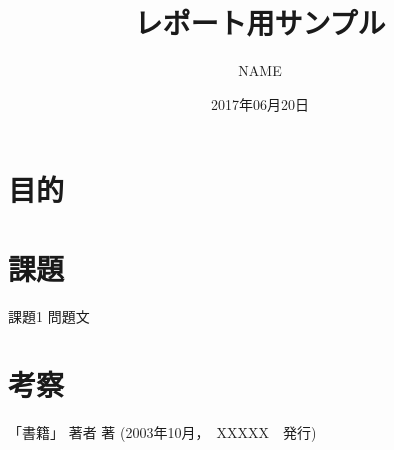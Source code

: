 \documentclass[11pt]{jsarticle}
\title{レポート用サンプル}
\date{2017年06月20日}
\author{NAME}
\begin{document}
	\maketitle
  \section{目的}

  \section{課題}
		\begin{itembox}[l]{課題1}
			問題文
		\end{itembox}

  \section{考察}

  \begin{thebibliography}{1}
  	 「書籍」 著者 著 (2003年10月，　XXXXX　発行)
  \end{thebibliography}
\end{document}
